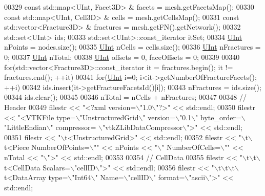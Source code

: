 \begin{DoxyCode}
00329     \textcolor{keyword}{const} std::map<UInt, Facet3D> & facets = mesh.getFacetsMap();
00330     \textcolor{keyword}{const} std::map<UInt, Cell3D> & cells = mesh.getCellsMap();
00331     \textcolor{keyword}{const} std::vector<Fracture3D> & fractures = mesh.getFN().getNetwork();
00332     std::set<UInt> ids;
00333     std::set<UInt>::const\_iterator itSet;
00334     \hyperlink{namespaceFVCode3D_a4bf7e328c75d0fd504050d040ebe9eda}{UInt} nPoints = nodes.size();
00335     \hyperlink{namespaceFVCode3D_a4bf7e328c75d0fd504050d040ebe9eda}{UInt} nCells = cells.size();
00336     \hyperlink{namespaceFVCode3D_a4bf7e328c75d0fd504050d040ebe9eda}{UInt} nFractures = 0;
00337     \hyperlink{namespaceFVCode3D_a4bf7e328c75d0fd504050d040ebe9eda}{UInt} nTotal;
00338     \hyperlink{namespaceFVCode3D_a4bf7e328c75d0fd504050d040ebe9eda}{UInt} offsets = 0, faceOffsets = 0;
00339 
00340     \textcolor{keywordflow}{for}(std::vector<Fracture3D>::const\_iterator it = fractures.begin(); it != fractures.end(); ++it)
00341         \textcolor{keywordflow}{for}(\hyperlink{namespaceFVCode3D_a4bf7e328c75d0fd504050d040ebe9eda}{UInt} i=0; i<it->getNumberOfFractureFacets(); ++i)
00342           ids.insert(it->getFractureFacetsId()[i]);
00343     nFractures = ids.size();
00344     ids.clear();
00345 
00346     nTotal = nCells + nFractures;
00347 
00348     \textcolor{comment}{// Header}
00349     filestr << \textcolor{stringliteral}{"<?xml version=\(\backslash\)"1.0\(\backslash\)"?>"} << std::endl;
00350     filestr << \textcolor{stringliteral}{"<VTKFile type=\(\backslash\)"UnstructuredGrid\(\backslash\)" version=\(\backslash\)"0.1\(\backslash\)" byte\_order=\(\backslash\)"LittleEndian\(\backslash\)" compressor=
      \(\backslash\)"vtkZLibDataCompressor\(\backslash\)">"} << std::endl;
00351     filestr << \textcolor{stringliteral}{"\(\backslash\)t<UnstructuredGrid>"} << std::endl;
00352     filestr << \textcolor{stringliteral}{"\(\backslash\)t\(\backslash\)t<Piece NumberOfPoints=\(\backslash\)""} << nPoints << \textcolor{stringliteral}{"\(\backslash\)" NumberOfCells=\(\backslash\)""} << nTotal << \textcolor{stringliteral}{"\(\backslash\)">"} << 
      std::endl;
00353 
00354     \textcolor{comment}{// CellData}
00355     filestr << \textcolor{stringliteral}{"\(\backslash\)t\(\backslash\)t\(\backslash\)t<CellData Scalars=\(\backslash\)"cellID\(\backslash\)">"} << std::endl;
00356     filestr << \textcolor{stringliteral}{"\(\backslash\)t\(\backslash\)t\(\backslash\)t\(\backslash\)t<DataArray type=\(\backslash\)"Int64\(\backslash\)" Name=\(\backslash\)"cellID\(\backslash\)" format=\(\backslash\)"ascii\(\backslash\)">"} << std::endl;

\end{DoxyCode}
